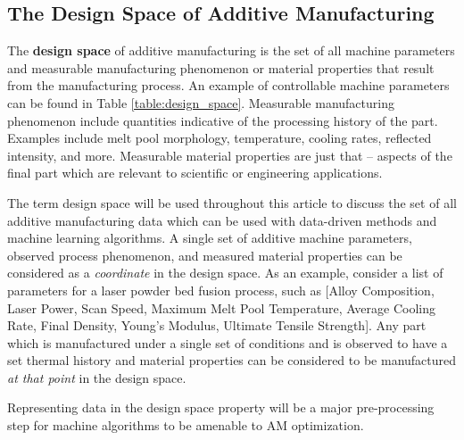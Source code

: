\subsection{The Design Space of Additive Manufacturing}
The \textbf{design space} of additive manufacturing is the set of all machine parameters and measurable manufacturing phenomenon or material properties that result from the manufacturing process. An example of controllable machine parameters can be found in Table \ref{table:design_space}. Measurable manufacturing phenomenon include quantities indicative of the processing history of the part. Examples include melt pool morphology, temperature, cooling rates, reflected intensity, and more. Measurable material properties are just that -- aspects of the final part which are relevant to scientific or engineering applications. 

The term design space will be used throughout this article to discuss the set of all additive manufacturing data which can be used with data-driven methods and machine learning algorithms. A single set of additive machine parameters, observed process phenomenon, and measured material properties can be considered as a \textit{coordinate} in the design space. As an example, consider a list of parameters for a laser powder bed fusion process, such as [Alloy Composition, Laser Power, Scan Speed, Maximum Melt Pool Temperature, Average Cooling Rate, Final Density, Young's Modulus, Ultimate Tensile Strength]. Any part which is manufactured under a single set of conditions and is observed to have a set thermal history and material properties can be considered to be manufactured \textit{at that point} in the design space.

Representing data in the design space property will be a major pre-processing step for machine algorithms to be amenable to AM optimization.

